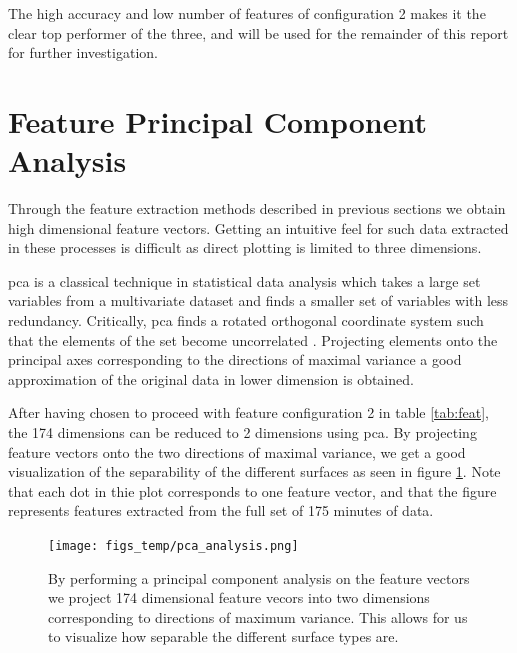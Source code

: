 The high accuracy and low number of features of configuration 2 makes it the clear top performer of the three, and will be used for the remainder of this report for further investigation.

\section{Feature Principal Component Analysis}

Through the feature extraction methods described in previous sections we obtain high dimensional feature vectors. Getting an intuitive feel for such data extracted in these processes is difficult as direct plotting is limited to three dimensions. 

\gls{pca} is  a classical technique in statistical data analysis which takes a large set variables from a multivariate dataset and finds a smaller set of variables with less redundancy. Critically, \gls{pca} finds a rotated orthogonal coordinate system such that the elements of the set become uncorrelated \citep{hyvasrinen_karhunen_oja_2004}. Projecting elements onto the principal axes corresponding to the directions of maximal variance a good approximation of the original data in lower dimension is obtained.

After having chosen to proceed with feature configuration 2 in table \ref{tab:feat}, the 174 dimensions can be reduced to 2 dimensions using \gls{pca}. By projecting feature vectors onto the two directions of maximal variance, we get a good visualization of the separability of the different surfaces as seen in figure \ref{fig:pca}. Note that each dot in thie plot corresponds to one feature vector, and that the figure represents features extracted from the full set of 175 minutes of data.  

\begin{figure}[h]
	\centering
	\texttt{[image: figs\_temp/pca\_analysis.png]}
	\caption{By performing a principal component analysis on the feature vectors we project 174 dimensional feature vecors into two dimensions corresponding to directions of maximum variance. This allows for us to visualize how separable the different surface types are.}
	\label{fig:pca}
\end{figure}

